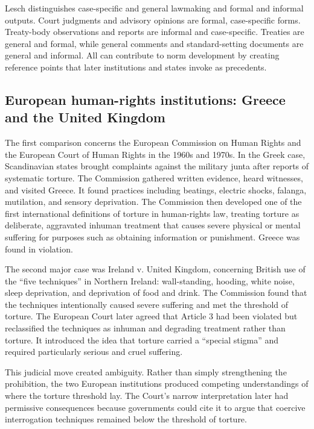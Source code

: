 Lesch distinguishes case-specific and general lawmaking and formal and informal outputs. Court judgments and advisory opinions are formal, case-specific forms. Treaty-body observations and reports are informal and case-specific. Treaties are general and formal, while general comments and standard-setting documents are general and informal. All can contribute to norm development by creating reference points that later institutions and states invoke as precedents.

\subsection{European human-rights institutions: Greece and the United Kingdom}

The first comparison concerns the European Commission on Human Rights and the European Court of Human Rights in the 1960s and 1970s. In the Greek case, Scandinavian states brought complaints against the military junta after reports of systematic torture. The Commission gathered written evidence, heard witnesses, and visited Greece. It found practices including beatings, electric shocks, falanga, mutilation, and sensory deprivation. The Commission then developed one of the first international definitions of torture in human-rights law, treating torture as deliberate, aggravated inhuman treatment that causes severe physical or mental suffering for purposes such as obtaining information or punishment. Greece was found in violation.

The second major case was Ireland v. United Kingdom, concerning British use of the ``five techniques'' in Northern Ireland: wall-standing, hooding, white noise, sleep deprivation, and deprivation of food and drink. The Commission found that the techniques intentionally caused severe suffering and met the threshold of torture. The European Court later agreed that Article 3 had been violated but reclassified the techniques as inhuman and degrading treatment rather than torture. It introduced the idea that torture carried a ``special stigma'' and required particularly serious and cruel suffering.

This judicial move created ambiguity. Rather than simply strengthening the prohibition, the two European institutions produced competing understandings of where the torture threshold lay. The Court's narrow interpretation later had permissive consequences because governments could cite it to argue that coercive interrogation techniques remained below the threshold of torture.


